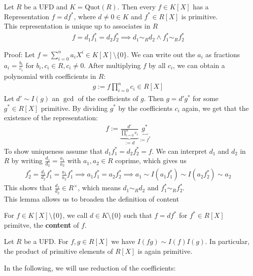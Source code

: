 \begin{lemma}[]
	Let $R$ be a UFD and $K = \text{Quot}(R)$. Then every $f \in K[X]$ has a Representation $f = d f^*$, where $d \neq 0 \in K$ and $f^* \in R[X]$ is primitive.\\
	This representation is unique up to associates in $R$
	\begin{align*}
		f = d_1f_1^* = d_2f_2^* \implies d_1 \sim_R d_2  \land f_1^* \sim_R f_2^*
	\end{align*}
\end{lemma}
Proof: Let $f = \sum_{i= 0}^n a_i X^i \in K[X] \setminus \{0\}$. We can write out the $a_i$ as fractions $a_i = \frac{b_i}{c_i}$ for $b_i, c_i \in R, c_i \neq 0$. After multiplying $f$ by all $c_i$, we can obtain a polynomial with coefficients in $R$:
\begin{align*}
	g := f\prod_{i = 0}^n c_i \in R[X]
\end{align*}
Let $d' \sim I(g)$ an $\gcd$ of the coefficients of $g$. Then $g = d' g^*$ for some $g^* \in R[X]$ primitive. By dividing $g^*$ by the coefficients $c_i$ again, we get that the existence of the representation:
\begin{align*}
	f := \underbrace{\frac{d'}{\prod_{i=0}^{n}c_i}}_{:= d} \underbrace{g^*}_{:= f^*}
\end{align*}
To show uniqueness assume that $d_1 f_1^* = d_2f_2^* = f$. 
We can interpret $d_1$ and $d_2$ in $R$ by writing $\frac{d_1}{d_2} = \frac{a_1}{a_2}$ with $a_1, a_2 \in R$ coprime, which gives us
\begin{align*}
	f_2^* = \frac{d_1}{d_2}f_1^* = \frac{a_1}{a_2}f_1^* \implies a_1f_1^* = a_2f_2^*	\implies a_1 \sim I(a_1f_1^*) \sim I(a_2f_2^*) \sim a_2
\end{align*}
This shows that $\frac{d_1}{d_2} \in R^{\times}$, which means $d_1 \sim_R d_2$ and $f_1^* \sim_R f_2^*$.\\


This lemma allows us to broaden the definition of content
\begin{definition}[]
	For $f \in K[X] \setminus \{0\}$, we call $d \in K \setminus \{0\}$ such that $f = df^*$ for $f^* \in R[X]$ primitve, the \textbf{content} of $f$.
\end{definition}


\begin{proposition}[]
	Let $R$ be a UFD. For $f,g \in R[X]$ we have $I(fg) \sim I(f) I(g)$. In particular, the product of primitive elements of $R[X]$ is again primitive.
\end{proposition}
In the following, we will use reduction of the coefficients:\\

